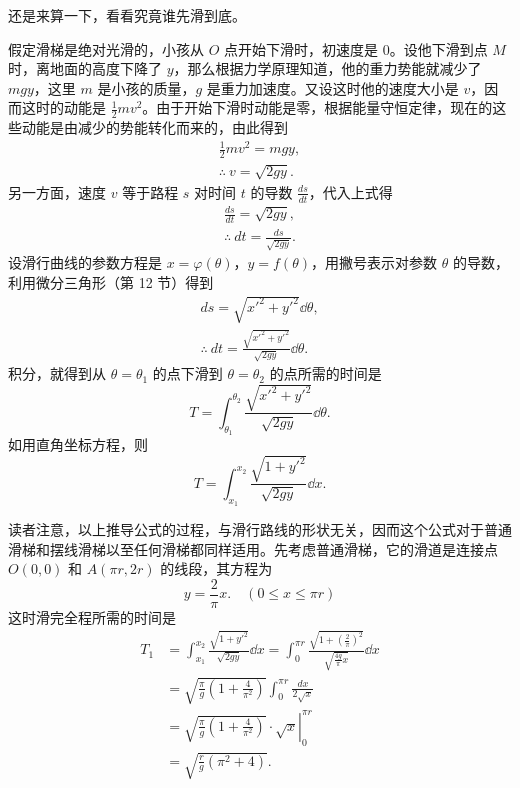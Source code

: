 还是来算一下，看看究竟谁先滑到底。

假定滑梯是绝对光滑的，小孩从 $O$ 点开始下滑时，初速度是 $0$。设他下滑到点 $M$ 时，离地面的高度下降了 $y$，那么根据力学原理知道，他的重力势能就减少了 $mgy$，这里 $m$ 是小孩的质量，$g$ 是重力加速度。又设这时他的速度大小是 $v$，因而这时的动能是 $\frac{1}{2}mv^2$。由于开始下滑时动能是零，根据能量守恒定律，现在的这些动能是由减少的势能转化而来的，由此得到
\begin{gather*}
  \frac{1}{2}mv^2 = mgy, \\
  \therefore\ v = \sqrt{2gy}.
\end{gather*}
另一方面，速度 $v$ 等于路程 $s$ 对时间 $t$ 的导数 $\frac{ds}{dt}$，代入上式得
\begin{gather*}
  \frac{ds}{dt} = \sqrt{2gy}, \\
  \therefore\ dt = \frac{ds}{\sqrt{2gy}}.
\end{gather*}
设滑行曲线的参数方程是 $x = \varphi(\theta)$，$y = f(\theta)$，用撇号表示对参数 $\theta$ 的导数，利用微分三角形（第 12 节）得到
\begin{gather*}
  ds = \sqrt{x'^2 + y'^2}\dd\theta, \\
  \therefore\ dt = \frac{\sqrt{x'^2 + y'^2}}{\sqrt{2gy}}\dd\theta.
\end{gather*}
积分，就得到从 $\theta = \theta_1$ 的点下滑到 $\theta = \theta_2$ 的点所需的时间是
\[
  T = \int_{\theta_1}^{\theta_2} \frac{\sqrt{x'^2 + y'^2}}{\sqrt{2gy}}\dd\theta.
\]
如用直角坐标方程，则
\[
  T = \int_{x_1}^{x_2} \frac{\sqrt{1 + y'^2}}{\sqrt{2gy}}\dd x.
\]

读者注意，以上推导公式的过程，与滑行路线的形状无关，因而这个公式对于普通滑梯和摆线滑梯以至任何滑梯都同样适用。先考虑普通滑梯，它的滑道是连接点 $O(0, 0)$ 和 $A(\pi r, 2r)$ 的线段，其方程为
\[
  y = \frac{2}{\pi}x.\quad (0 \leqslant x \leqslant \pi r)
\]
这时滑完全程所需的时间是
\begin{align*}
  T_1 &= \int_{x_1}^{x_2} \frac{\sqrt{1 + y'^2}}{\sqrt{2gy}}\dd x
       = \int_{0}^{\pi r} \frac{\sqrt{1 + \left(\frac{2}{\pi}\right)^2}}{\sqrt{\frac{4g}{\pi}x}}\dd x \\
      &= \sqrt{\frac{\pi}{g}\left(1 + \frac{4}{\pi^2}\right)} \int_{0}^{\pi r} \frac{dx}{2\sqrt{x}} \\
      &= \left.\sqrt{\frac{\pi}{g}\left(1 + \frac{4}{\pi^2}\right)} \cdot \sqrt{x}\right|_{0}^{\pi r} \\
      &= \sqrt{\frac{r}{g}(\pi^2 + 4)}.
\end{align*}

